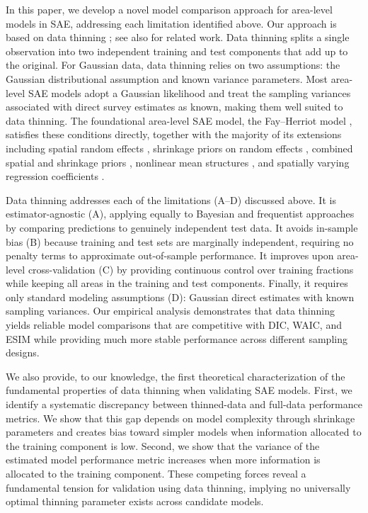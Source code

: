 \documentclass[11pt]{article}
\theoremstyle{plain}
\theoremstyle{definition}
\theoremstyle{remark}
\begin{document}
In this paper, we develop a novel model comparison approach for area-level models in SAE, addressing each limitation identified above. Our approach is based on data thinning \citep{neufeld_data_2024, dharamshi_generalized_2025}; see also \citet{rasines_splitting_2023, leiner_data_2025, oliveira_unbiased_2024} for related work. Data thinning splits a single observation into two independent training
and test components that add up to the original.
For Gaussian data, data thinning relies on two assumptions: the Gaussian distributional assumption and known variance parameters.
Most area-level SAE models adopt a Gaussian likelihood and treat the sampling variances associated with direct survey estimates as known, making them well suited to data thinning.
The foundational area-level SAE model, the Fay--Herriot model \citep{fay_estimates_1979}, satisfies these conditions directly, together with the majority of its extensions including spatial random effects \citep{zhou_hierarchical_2008}, shrinkage priors on random effects \citep{datta_small_2015}, combined spatial and shrinkage priors  \citep{kawano_spatially_2025},  nonlinear mean structures \citep{parker_nonlinear_2024}, and spatially varying regression coefficients \citep{janicki_bayesian_2022}.

Data thinning addresses each of the limitations (A--D) discussed above. It is estimator-agnostic (A), applying equally to Bayesian and frequentist approaches by comparing predictions to genuinely independent test data. It avoids in-sample bias (B) because training and test sets are marginally independent, requiring no penalty terms to approximate out-of-sample performance. It improves upon area-level cross-validation (C) by providing continuous control over training fractions while keeping all areas in the training and test components. Finally, it requires only standard modeling assumptions (D): Gaussian direct estimates with known sampling variances. Our empirical analysis demonstrates that data thinning
yields reliable model comparisons that are competitive with DIC, WAIC, and ESIM while providing much more stable performance across different sampling designs.

We also provide, to our knowledge, the first theoretical characterization of the fundamental properties of data thinning when validating SAE models. First, we identify a systematic discrepancy between thinned-data and full-data performance metrics. We show that this gap depends on model complexity through shrinkage parameters and creates bias toward simpler models when information allocated to the training component is low. Second, we show that the variance of the estimated model performance metric increases when more information is allocated to the training component. These competing forces reveal a fundamental tension for validation using data thinning, implying no universally optimal thinning parameter exists across candidate models.
\end{document}
